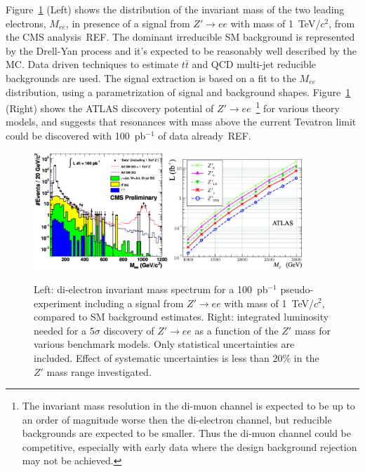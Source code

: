 \documentclass{cimento}
\begin{document}
Figure~\ref{fig:MeeAndZPrimeDisc} (Left) shows the distribution of 
the invariant mass of the two leading electrons, $M_{ee}$, in presence of 
a signal from $Z' \rightarrow ee$ with mass of 1~TeV/$c^2$, 
from the CMS analysis~REF. The dominant irreducible SM background 
is represented by the Drell-Yan process and it's expected to be 
reasonably well described by the MC. Data driven techniques to estimate $t\bar{t}$ and QCD multi-jet
reducible backgrounds are used. The signal extraction is based on a fit 
to the $M_{ee}$ distribution, using a parametrization of signal and 
background shapes. Figure~\ref{fig:MeeAndZPrimeDisc} (Right)
shows the ATLAS discovery potential of 
$Z' \rightarrow ee$~\footnote{The invariant mass resolution 
in the di-muon channel is expected to be up to an 
order of magnitude worse then the di-electron channel, but reducible backgrounds
are expected to be smaller. Thus the di-muon channel could be competitive, 
especially with early data where the design background rejection may not be 
achieved.} for various theory 
models, and suggests that resonances with mass 
above the current Tevatron limit could be discovered with 
100~pb$^{-1}$ of data already~REF. 

\begin{figure}[htbp] 
\centering
\includegraphics[width=0.45\textwidth]{st_mass_all_withZPrime_ALLTOPO.eps}\includegraphics[width=0.45\textwidth]{fig9L.eps}
\caption{Left: di-electron invariant mass spectrum for a 
100~pb$^{-1}$ pseudo-experiment including a signal from 
$Z' \rightarrow ee$ with mass of 1~TeV/$c^2$, 
compared to SM background estimates. Right: integrated 
luminosity needed for a $5\sigma$ discovery of $Z' \rightarrow ee$
as a function of the $Z'$ mass for various benchmark models. Only 
statistical uncertainties are included. 
Effect of systematic uncertainties is less than 20\% in the $Z'$ mass
range investigated.}
\label{fig:MeeAndZPrimeDisc}
\end{figure}
\end{document}
